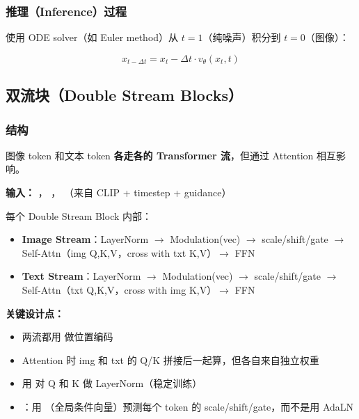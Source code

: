 \subsubsection{推理（Inference）过程}

使用 ODE solver（如 Euler method）从 $t=1$（纯噪声）积分到 $t=0$（图像）：

$$x_{t - \Delta t} = x_t - \Delta t \cdot v_\theta(x_t, t)$$

\subsection{双流块（Double Stream Blocks）}

\subsubsection{结构}

图像 token 和文本 token \textbf{各走各的 Transformer 流}，但通过 Attention 相互影响。

\textbf{输入：} \code{[B, N\_img, D]}， \code{[B, N\_txt, D]}， \code{[B, D]}（来自 CLIP + timestep + guidance）

每个 Double Stream Block 内部：
\begin{itemize}[leftmargin=1.5em]
  \item \textbf{Image Stream}：LayerNorm $\to$ Modulation(vec) $\to$ scale/shift/gate $\to$ Self-Attn（img Q,K,V，cross with txt K,V）$\to$ FFN
  \item \textbf{Text Stream}：LayerNorm $\to$ Modulation(vec) $\to$ scale/shift/gate $\to$ Self-Attn（txt Q,K,V，cross with img K,V）$\to$ FFN
\end{itemize}

\begin{conceptbox}
\textbf{关键设计点：}
\begin{itemize}[leftmargin=1.5em]
  \item 两流都用  做位置编码
  \item Attention 时 img 和 txt 的 Q/K 拼接后一起算，但各自来自独立权重
  \item 用  对 Q 和 K 做 LayerNorm（稳定训练）
  \item {}：用 （全局条件向量）预测每个 token 的 scale/shift/gate，而不是用 AdaLN
\end{itemize}
\end{conceptbox}

